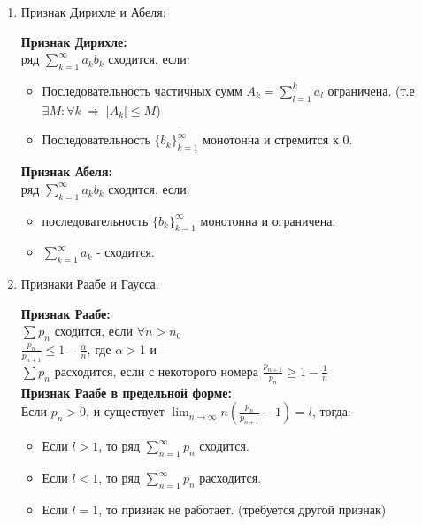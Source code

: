 \documentclass[a4paper, 12pt]{article}
\begin{document}
\begin{enumerate}
\begin{mdframed}
	      \end{mdframed}
	\item Признак Дирихле и Абеля: \\
	      \begin{mdframed}
		      \textbf{Признак Дирихле:} \\
		      ряд $\sum_{k=1}^{\infty} a_k b_k$ сходится, если:
		      \begin{itemize}
			      \item Последовательность частичных сумм $A_k = \sum_{l=1}^{k} a_l$ ограничена. (т.е $\exists M: \forall k \ \Rightarrow \ |A_k| \le M$)
			      \item Последовательность $\{b_k\}^{\infty}_{k=1}$ монотонна и стремится к 0.
		      \end{itemize}
		      \textbf{Признак Абеля:} \\
		      ряд $\sum_{k=1}^{\infty} a_k b_k$ сходится, если:
		      \begin{itemize}
			      \item последовательность $\{b_k\}^{\infty}_{k=1}$ монотонна и ограничена.
			      \item $\sum_{k=1}^{\infty} a_k$ - сходится.
		      \end{itemize}
	      \end{mdframed}
	\item Признаки Раабе и Гаусса. \\
	      \begin{mdframed}
		      \textbf{Признак Раабе:} \\
		      $\sum p_n$ сходится, если  $\forall n>n_0$ \\
		      $\frac{p_n}{p_{n+1}} \le  1- \frac{\alpha}{n}$, где $\alpha > 1$ и \\
		      $\sum p_n$ расходится, если с некоторого номера $\frac{p_{n+1}}{p_n} \ge 1-\frac{1}{n}$ \\
		      \textbf{Признак Раабе в предельной форме:} \\
		      Если $p_n > 0$, и существует $\lim_{n \to \infty} n \left( \frac{p_n}{p_{n+1}} - 1 \right) = l$, тогда:
		      \begin{itemize}
			      \item Если $l > 1$, то ряд $\sum_{n=1}^{\infty} p_n$ сходится.
			      \item Если $l < 1$, то ряд $\sum_{n=1}^{\infty} p_n$ расходится.
			      \item Если $l = 1$, то признак не работает. (требуется другой признак)
		      \end{itemize}

\end{mdframed}
\end{enumerate}
\end{document}
